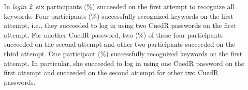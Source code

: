 In \textit{login 2}, six participants (\%) succeeded on the first attempt to recognize all  keywords. Four participants (\%) successfully recognized  keywords on the first attempt, i.e., they succeeded to log in using two CuedR passwords on the first attempt. For another CuedR password, two (\%) of these four participants succeeded on the second attempt and other two participants succeeded on the third attempt. One participant (\%) successfully recognized  keywords on the first attempt. In particular, she succeeded to log in using one CuedR password on the first attempt and succeeded on the second attempt for other two CuedR passwords. 











